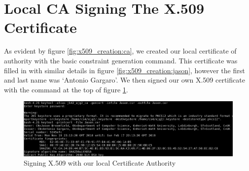 \section{Local CA Signing The X.509 Certificate}

As evident by figure \ref{fig:x509_creation:ca}, we created our local certificate of authority with the basic constraint generation command. This certificate was filled in with similar details in figure \ref{fig:x509_creation:jason}, however the first and last name was `Antonio Gargaro'. We then signed our own X.509 certificate with the command at the top of figure \ref{fig:ca_sign:ca_sign_x509}.

\begin{figure}[hbt!]
	\centering
	\includegraphics[width=\textwidth]{imgs/x509_creation/x509_Signed_By_CA.PNG}
	\caption{Signing X.509 with our local Certificate Authority}
	\label{fig:ca_sign:ca_sign_x509}
    \noindent\makebox[\linewidth]{}
\end{figure}
